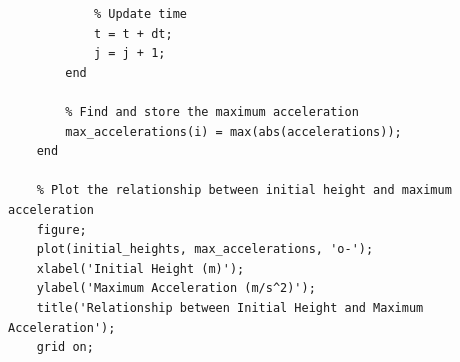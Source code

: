 \documentclass[12pt]{article}
\begin{document}
\begin{lstlisting}
            % Update time
            t = t + dt;
            j = j + 1;
        end
        
        % Find and store the maximum acceleration
        max_accelerations(i) = max(abs(accelerations));
    end

    % Plot the relationship between initial height and maximum acceleration
    figure;
    plot(initial_heights, max_accelerations, 'o-');
    xlabel('Initial Height (m)');
    ylabel('Maximum Acceleration (m/s^2)');
    title('Relationship between Initial Height and Maximum Acceleration');
    grid on;
\end{lstlisting}




\end{document}
